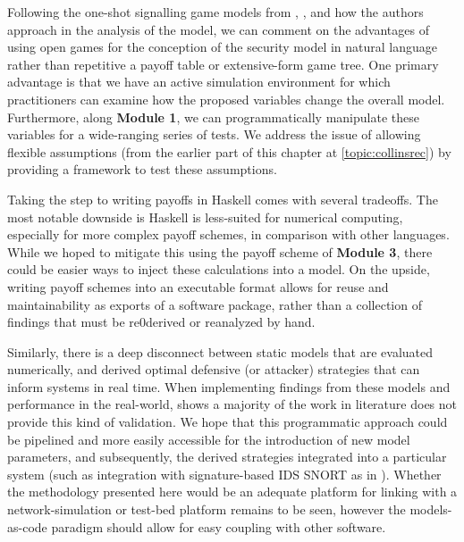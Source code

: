 \documentclass[11pt,titlepage,dvipsnames,table,xcdraw,english]{article}
\newtheorem{example}{Example}
\begin{document}
Following the one-shot signalling game models from \cite{la2016deceptive}, \cite{boumkheldHoneypotTypeSelection2019}, \cite{Carroll2009} and how the authors approach in the analysis of the model, we can comment on the advantages of using open games for the conception of the security model in natural language rather than repetitive a payoff table or extensive-form game tree. One primary advantage is that we have an active simulation environment for which practitioners can examine how the proposed variables change the overall model. Furthermore, along \textbf{Module 1}, we can programmatically manipulate these variables for a wide-ranging series of tests. We address the issue of allowing flexible assumptions (from the earlier part of this chapter at \ref{topic:collinsrec}) by providing a framework to test these assumptions.

Taking the step to writing payoffs in Haskell comes with several tradeoffs. The most notable downside is Haskell is less-suited for numerical computing, especially for more complex payoff schemes, in comparison with other languages. While we hoped to mitigate this using the payoff scheme of \textbf{Module 3}, there could be easier ways to inject these calculations into a model. On the upside, writing payoff schemes into an executable format allows for reuse and maintainability as exports of a software package, rather than a collection of findings that must be re0derived or reanalyzed by hand.  


		
Similarly, there is a deep disconnect between static models that are evaluated numerically, and derived optimal defensive (or attacker) strategies that can inform systems in real time. When implementing findings from these models and performance in the real-world, \cite{kiennertSurveyGameTheoreticApproaches2018} shows a majority of the work in literature does not provide this kind of validation. We hope that this programmatic approach could be pipelined and more easily accessible for the introduction of new model parameters, and subsequently, the derived strategies integrated into a particular system (such as integration with signature-based IDS SNORT as in \cite{zonouzRREGametheoreticIntrusion2009}). Whether the methodology presented here would be an adequate platform for linking with a network-simulation or test-bed platform remains to be seen, however the models-as-code paradigm should allow for easy coupling with other software. 
\end{document}
